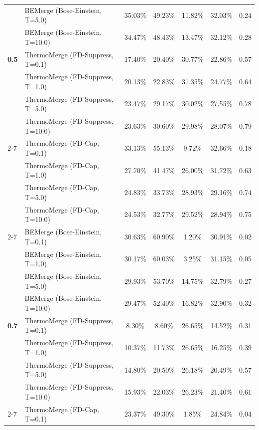 \documentclass{article}
\theoremstyle{plain}
\theoremstyle{definition}
\theoremstyle{remark}
\begin{document}
\begin{table}[h]
\begin{center}
\begin{footnotesize}
\begin{tabular}{llccccc}
             & BEMerge (Bose-Einstein, T=5.0) & 35.03\% & 49.23\% & 11.82\% & 32.03\% & 0.24 \\
             & BEMerge (Bose-Einstein, T=10.0) & 34.47\% & 48.43\% & 13.47\% & 32.12\% & 0.28 \\
\midrule
\textbf{0.5} & ThermoMerge (FD-Suppress, T=0.1) & 17.40\% & 20.40\% & 30.77\% & 22.86\% & 0.57 \\
             & ThermoMerge (FD-Suppress, T=1.0) & 20.13\% & 22.83\% & 31.35\% & 24.77\% & 0.64 \\
             & ThermoMerge (FD-Suppress, T=5.0) & 23.47\% & 29.17\% & 30.02\% & 27.55\% & 0.78 \\
             & ThermoMerge (FD-Suppress, T=10.0) & 23.63\% & 30.60\% & 29.98\% & 28.07\% & 0.79 \\
\cmidrule{2-7}
             & ThermoMerge (FD-Cap, T=0.1) & 33.13\% & 55.13\% & 9.72\% & 32.66\% & 0.18 \\
             & ThermoMerge (FD-Cap, T=1.0) & 27.70\% & 41.47\% & 26.00\% & 31.72\% & 0.63 \\
             & ThermoMerge (FD-Cap, T=5.0) & 24.83\% & 33.73\% & 28.93\% & 29.16\% & 0.74 \\
             & ThermoMerge (FD-Cap, T=10.0) & 24.53\% & 32.77\% & 29.52\% & 28.94\% & 0.75 \\
\cmidrule{2-7}
             & BEMerge (Bose-Einstein, T=0.1) & 30.63\% & 60.90\% & 1.20\% & 30.91\% & 0.02 \\
             & BEMerge (Bose-Einstein, T=1.0) & 30.17\% & 60.03\% & 3.25\% & 31.15\% & 0.05 \\
             & BEMerge (Bose-Einstein, T=5.0) & 29.93\% & 53.70\% & 14.75\% & 32.79\% & 0.27 \\
             & BEMerge (Bose-Einstein, T=10.0) & 29.47\% & 52.40\% & 16.82\% & 32.90\% & 0.32 \\
\midrule
\textbf{0.7} & ThermoMerge (FD-Suppress, T=0.1) & 8.30\% & 8.60\% & 26.65\% & 14.52\% & 0.31 \\
             & ThermoMerge (FD-Suppress, T=1.0) & 10.37\% & 11.73\% & 26.65\% & 16.25\% & 0.39 \\
             & ThermoMerge (FD-Suppress, T=5.0) & 14.80\% & 20.50\% & 26.18\% & 20.49\% & 0.57 \\
             & ThermoMerge (FD-Suppress, T=10.0) & 15.93\% & 22.03\% & 26.23\% & 21.40\% & 0.61 \\
\cmidrule{2-7}
             & ThermoMerge (FD-Cap, T=0.1) & 23.37\% & 49.30\% & 1.85\% & 24.84\% & 0.04 \\

\end{tabular}
\end{footnotesize}
\end{center}
\end{table}
\end{document}
